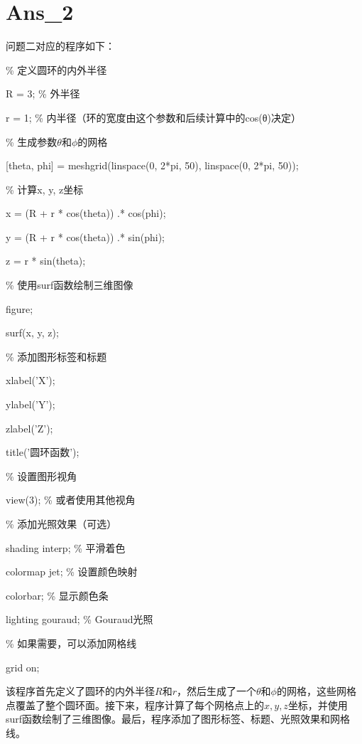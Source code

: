 \documentclass[UTF8]{ctexart}
\begin{document}
	
	\section*{Ans\_2}
	问题二对应的程序如下：
	
	
	\sffamily
	\% 定义圆环的内外半径
	
	R = 3; \% 外半径
	
	r = 1; \% 内半径（环的宽度由这个参数和后续计算中的cos(θ)决定）
	
	\vspace*{1\baselineskip}
	\% 生成参数$\theta$和$\phi$的网格
	
	\vspace*{1\baselineskip}
	[theta, phi] = meshgrid(linspace(0, 2*pi, 50), linspace(0, 2*pi, 50));
	
	\vspace*{1\baselineskip}
	\% 计算x, y, z坐标
	
	x = (R + r * cos(theta)) .* cos(phi);
	
	y = (R + r * cos(theta)) .* sin(phi);
	
	z = r * sin(theta);
	
	\vspace*{1\baselineskip}
	\% 使用surf函数绘制三维图像
	
	figure;
	
	surf(x, y, z);
	
	\vspace*{1\baselineskip}
	\% 添加图形标签和标题
	
	xlabel('X');
	
	ylabel('Y');
	
	zlabel('Z');
	
	title('圆环函数');
	
	\vspace*{1\baselineskip}
	\% 设置图形视角
	
	view(3); \% 或者使用其他视角
	
	\vspace*{1\baselineskip}
	\% 添加光照效果（可选）
	
	shading interp; \% 平滑着色
	
	colormap jet;   \% 设置颜色映射
	
	colorbar;      \% 显示颜色条
	
	lighting gouraud; \% Gouraud光照
	
	\vspace*{1\baselineskip}
	\% 如果需要，可以添加网格线
	
	grid on;
	
	\vspace*{1\baselineskip}
	\rmfamily
	该程序首先定义了圆环的内外半径$R$和$r$，然后生成了一个$\theta$和$\phi$的网格，这些网格点覆盖了整个圆环面。接下来，程序计算了每个网格点上的$x,y,z$坐标，并使用surf函数绘制了三维图像。最后，程序添加了图形标签、标题、光照效果和网格线。
	
\end{document}
